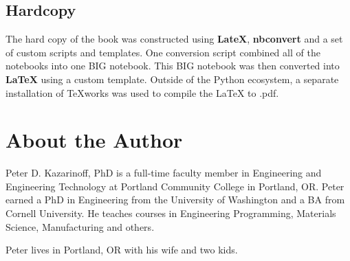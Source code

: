 \documentclass{book}
\begin{document}
    
        \subsection{Hardcopy}\label{hardcopy}
    




    
        The hard copy of the book was constructed using \textbf{LateX},
\textbf{nbconvert} and a set of custom scripts and templates. One
conversion script combined all of the notebooks into one BIG notebook.
This BIG notebook was then converted into \textbf{LaTeX} using a custom
template. Outside of the Python ecosystem, a separate installation of
TeXworks was used to compile the LaTeX to .pdf.
    




    
        \section{About the Author}\label{about-the-author}
    




    
        Peter D. Kazarinoff, PhD is a full-time faculty member in Engineering
and Engineering Technology at Portland Community College in Portland,
OR. Peter earned a PhD in Engineering from the University of Washington
and a BA from Cornell University. He teaches courses in Engineering
Programming, Materials Science, Manufacturing and others.

Peter lives in Portland, OR with his wife and two kids.
    




    
    
    
    
\end{document}
